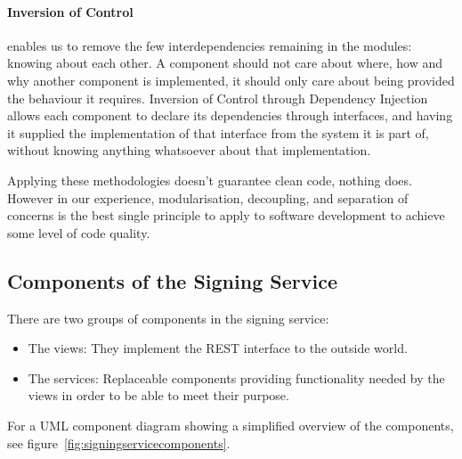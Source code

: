 \paragraph{Inversion of Control} enables us to remove the few interdependencies remaining in the modules:
knowing about each other.
A component should not care about where, how and why another component is implemented,
it should only care about being provided the behaviour it requires.
Inversion of Control through Dependency Injection allows each component to declare
its dependencies through interfaces,
and having it supplied the implementation of that interface from the system it is part of,
without knowing anything whatsoever about that implementation.

Applying these methodologies doesn't guarantee clean code, nothing does.
However in our experience, modularisation, decoupling, and separation of concerns is the best single principle
to apply to software development to achieve some level of code quality.

\subsection{Components of the Signing Service}\label{subsec:modules-of-the-signing-service}
There are two groups of components in the signing service:
\begin{itemize}
    \item The views: They implement the \gls{REST} interface to the outside world.
    \item The services: Replaceable components providing functionality needed by the views in order to
    be able to meet their purpose.
\end{itemize}

For a \gls{UML} component diagram showing a simplified overview of the components, see figure~\ref{fig:signingservicecomponents}.

